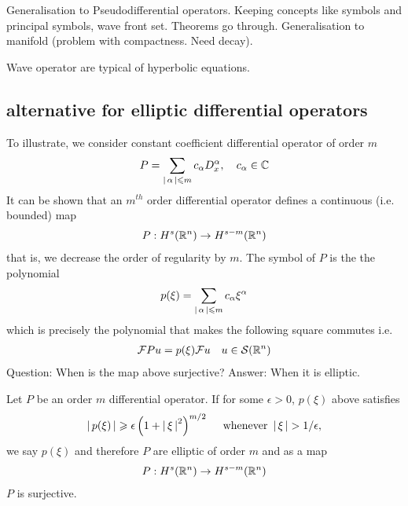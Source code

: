 \documentclass{article}
\begin{document}
Generalisation to Pseudodifferential operators. Keeping concepts like symbols and principal symbols, wave front set. Theorems go through. Generalisation to manifold (problem with compactness. Need decay). 

Wave operator are typical of hyperbolic equations. 




\subsection{alternative for elliptic differential operators} 
To illustrate, we consider constant coefficient differential operator of order $m$
\begin{align*}
P = \sum_{\left|\, \alpha\,\right| \leqslant m} c_\alpha D^\alpha_x, \quad c_\alpha \in {\ensuremath {\mathbb C}}
\end{align*}
It can be shown that an $m^{th}$ order differential operator defines a continuous (i.e. bounded) map 
\begin{align*}
P : H^{s}({\mathbb R}^n) \to H^{s - m}({\mathbb R}^n)
\end{align*}
that is, we decrease the order of regularity by $m$. The symbol of $P$ is the the polynomial 
\begin{align*}
p(\xi) = \sum_{\left|\, \alpha\,\right| \leqslant m} c_\alpha \xi^\alpha 
\end{align*}
which is precisely the polynomial that makes the following square commutes
i.e. 
\begin{align*}
{\ensuremath {\cal F}} Pu  = p(\xi) {\cal F} u  \quad u \in \mathcal{S}({\mathbb R}^n) 
\end{align*}
Question: When is the map above surjective? Answer: When it is elliptic. 

\begin{theorem}
    Let $P$ be an order $m$ differential operator. If for some $\epsilon > 0$, $p(\xi)$ above satisfies
    \begin{align*}
    \left|\, p(\xi)\,\right| \geqslant \epsilon \left( 1 + \left|\, \xi\,\right|^2\right)^{m / 2} \quad \text{ whenever } \left|\, \xi\,\right| > 1/\epsilon, 
    \end{align*}
    we say $p(\xi)$ and therefore $P$ are elliptic of order $m$ and as a map
    \begin{align*}
    P: H^{s}({\mathbb R}^n) \to H^{s - m}({\mathbb R}^n)
    \end{align*}
    $P$ is surjective. 
\end{theorem}
 \\
\end{document}
